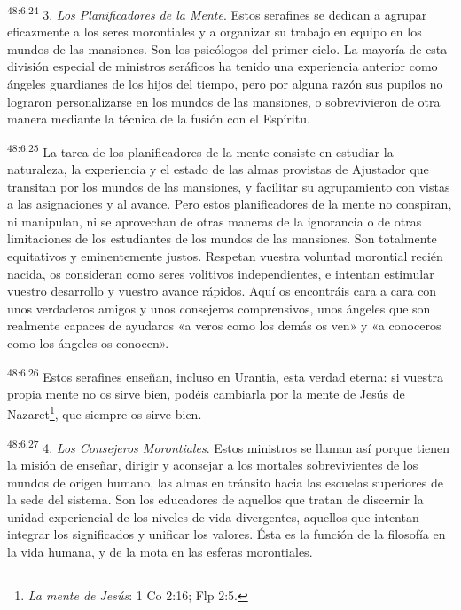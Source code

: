 \par
\textsuperscript{48:6.24} 3. \textit{Los Planificadores de la Mente}. Estos serafines se dedican a agrupar eficazmente a los seres morontiales y a organizar su trabajo en equipo en los mundos de las mansiones. Son los psicólogos del primer cielo. La mayoría de esta división especial de ministros seráficos ha tenido una experiencia anterior como ángeles guardianes de los hijos del tiempo, pero por alguna razón sus pupilos no lograron personalizarse en los mundos de las mansiones, o sobrevivieron de otra manera mediante la técnica de la fusión con el Espíritu.

\par
\textsuperscript{48:6.25} La tarea de los planificadores de la mente consiste en estudiar la naturaleza, la experiencia y el estado de las almas provistas de Ajustador que transitan por los mundos de las mansiones, y facilitar su agrupamiento con vistas a las asignaciones y al avance. Pero estos planificadores de la mente no conspiran, ni manipulan, ni se aprovechan de otras maneras de la ignorancia o de otras limitaciones de los estudiantes de los mundos de las mansiones. Son totalmente equitativos y eminentemente justos. Respetan vuestra voluntad morontial recién nacida, os consideran como seres volitivos independientes, e intentan estimular vuestro desarrollo y vuestro avance rápidos. Aquí os encontráis cara a cara con unos verdaderos amigos y unos consejeros comprensivos, unos ángeles que son realmente capaces de ayudaros «a veros como los demás os ven» y «a conoceros como los ángeles os conocen».

\par
\textsuperscript{48:6.26} Estos serafines enseñan, incluso en Urantia, esta verdad eterna: si vuestra propia mente no os sirve bien, podéis cambiarla por la mente de Jesús de Nazaret\footnote{\textit{La mente de Jesús}: 1 Co 2:16; Flp 2:5.}, que siempre os sirve bien.

\par
\textsuperscript{48:6.27} 4. \textit{Los Consejeros Morontiales}. Estos ministros se llaman así porque tienen la misión de enseñar, dirigir y aconsejar a los mortales sobrevivientes de los mundos de origen humano, las almas en tránsito hacia las escuelas superiores de la sede del sistema. Son los educadores de aquellos que tratan de discernir la unidad experiencial de los niveles de vida divergentes, aquellos que intentan integrar los significados y unificar los valores. Ésta es la función de la filosofía en la vida humana, y de la mota en las esferas morontiales.

